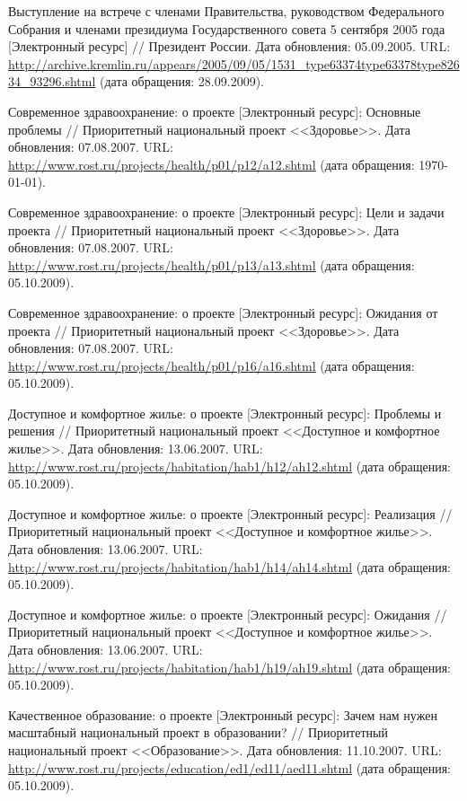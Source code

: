\begin{thebibliography}{99}
 Выступление на встрече с членами Правительства,
  руководством Федерального Собрания и членами президиума
  Государственного совета 5 сентября 2005 года [Электронный ресурс] //
  Президент России. Дата обновления: 05.09.2005. URL:
  \url{http://archive.kremlin.ru/appears/2005/09/05/1531_type63374type63378type82634_93296.shtml}
  (дата обращения: 28.09.2009).

 Современное здравоохранение: о проекте
  [Электронный ресурс]: Основные проблемы // Приоритетный национальный
  проект <<Здоровье>>. Дата обновления: 07.08.2007. URL:
  \url{http://www.rost.ru/projects/health/p01/p12/a12.shtml} (дата
  обращения: \today).

 Современное здравоохранение: о проекте
  [Электронный ресурс]: Цели и задачи проекта // Приоритетный
  национальный проект <<Здоровье>>. Дата обновления: 07.08.2007. URL:
  \url{http://www.rost.ru/projects/health/p01/p13/a13.shtml} (дата
  обращения: 05.10.2009).

 Современное здравоохранение: о проекте
  [Электронный ресурс]: Ожидания от проекта // Приоритетный
  национальный проект <<Здоровье>>. Дата обновления: 07.08.2007. URL:
  \url{http://www.rost.ru/projects/health/p01/p16/a16.shtml} (дата
  обращения: 05.10.2009).

 Доступное и комфортное жилье: о проекте
  [Электронный ресурс]: Проблемы и решения // Приоритетный
  национальный проект <<Доступное и комфортное жилье>>. Дата
  обновления: 13.06.2007. URL:
  \url{http://www.rost.ru/projects/habitation/hab1/h12/ah12.shtml}
  (дата обращения: 05.10.2009).

 Доступное и комфортное жилье: о проекте
  [Электронный ресурс]: Реализация // Приоритетный национальный проект
  <<Доступное и комфортное жилье>>. Дата обновления: 13.06.2007. URL:
  \url{http://www.rost.ru/projects/habitation/hab1/h14/ah14.shtml}
  (дата обращения: 05.10.2009).

 Доступное и комфортное жилье: о проекте
  [Электронный ресурс]: Ожидания // Приоритетный национальный проект
  <<Доступное и комфортное жилье>>. Дата обновления: 13.06.2007. URL:
  \url{http://www.rost.ru/projects/habitation/hab1/h19/ah19.shtml}
  (дата обращения: 05.10.2009).

 Качественное образование: о проекте
  [Электронный ресурс]: Зачем нам нужен масштабный национальный проект
  в образовании? // Приоритетный национальный проект
  <<Образование>>. Дата обновления: 11.10.2007. URL:
  \url{http://www.rost.ru/projects/education/ed1/ed11/aed11.shtml}
  (дата обращения: 05.10.2009).

\end{thebibliography}

